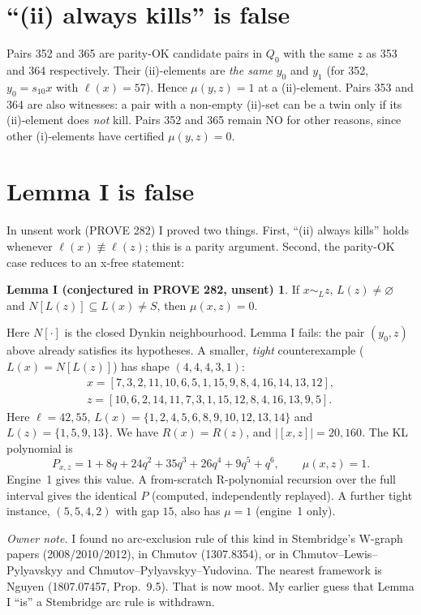 \documentclass[11pt]{amsart}
\newcommand{\gr}[1]{\textsf{#1}}
\theoremstyle{definition}
\newtheorem*{lemmaI}{Lemma I (conjectured in PROVE 282, unsent)}
\begin{document}
\section{``(ii) always kills'' is false}

Pairs 352 and 365 are parity-OK candidate pairs in $Q_0$ with the same $z$ as 353 and 364 respectively. Their (ii)-elements are \emph{the same} $y_0$ and $y_1$ (for 352, $y_0=s_{10}x$ with $\ell(x)=57$). Hence $\mu(y,z)=1$ at a (ii)-element. Pairs 353 and 364 are also witnesses: a pair with a non-empty (ii)-set can be a twin only if its (ii)-element does \emph{not} kill. Pairs 352 and 365 remain NO for other reasons, since other (i)-elements have certified $\mu(y,z)=0$.

\section{Lemma I is false}

In unsent work (PROVE 282) I proved two things. First, ``(ii) always kills'' holds whenever $\ell(x)\not\equiv\ell(z)$; this is a parity argument. Second, the parity-OK case reduces to an x-free statement:
\begin{lemmaI}
If $x\sim_L z$, $L(z)\ne\varnothing$ and $N[L(z)]\subseteq L(x)\ne S$, then $\mu(x,z)=0$.
\end{lemmaI}
\noindent Here $N[\cdot]$ is the closed Dynkin neighbourhood. Lemma I fails: the pair $(y_0,z)$ above already satisfies its hypotheses. A smaller, \emph{tight} counterexample ($L(x)=N[L(z)]$) has shape $(4,4,4,3,1)$:
\begin{gather*}x=[7,3,2,11,10,6,5,1,15,9,8,4,16,14,13,12],\\ z=[10,6,2,14,11,7,3,1,15,12,8,4,16,13,9,5].\end{gather*}
Here $\ell=42,55$, $L(x)=\{1,2,4,5,6,8,9,10,12,13,14\}$ and $L(z)=\{1,5,9,13\}$. We have $R(x)=R(z)$, and $|[x,z]|=20{,}160$. The KL polynomial is
\[P_{x,z}=1+8q+24q^2+35q^3+26q^4+9q^5+q^6,\qquad \mu(x,z)=1.\]
Engine~1 gives this value. A from-scratch R-polynomial recursion over the full interval gives the identical $P$ (\gr{computed}, independently replayed). A further tight instance, $(5,5,4,2)$ with gap $15$, also has $\mu=1$ (engine~1 only).

\emph{Owner note.} I found no arc-exclusion rule of this kind in Stembridge's W-graph papers (2008/2010/2012), in Chmutov (1307.8354), or in Chmutov--Lewis--Pylyavskyy and Chmutov--Pylyavskyy--Yudovina. The nearest framework is Nguyen (1807.07457, Prop.~9.5). That is now moot. My earlier guess that Lemma I ``is'' a Stembridge arc rule is withdrawn.
\end{document}
